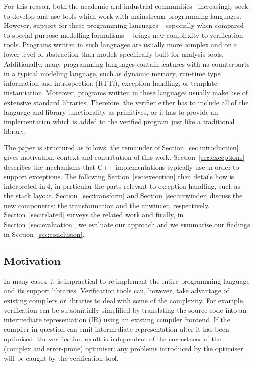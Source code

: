For this reason, both the academic and industrial
communities~\cite{beyer16:reliab.reprod} increasingly seek to develop
and use tools which work with mainstream programming languages. However,
support for these programming languages -- especially when compared to
special-purpose modelling formalisms -- brings new complexity to
verification tools. Programs written in such languages are usually more
complex and on a lower level of abstraction than models specifically
built for analysis tools. Additionally, many programming languages
contain features with no counterparts in a typical modeling language,
such as dynamic memory, run-time type information and introspection
(RTTI), exception handling, or template instantiation. Moreover,
programs written in these languages usually make use of extensive
standard libraries. Therefore, the verifier either has to include all of
the language and library functionality as primitives, or it has to
provide an implementation which is added to the verified program just
like a traditional library.

The paper is structured as follows: the remainder of
Section~\ref{sec:introduction} gives motivation, context and
contribution of this work. Section~\ref{sec:exceptions} describes the
mechanisms that C++ implementations typically use in order to support
exceptions. The following Section~\ref{sec:execution} then details how
\llvm{} is interpreted in \divine{} 4, in particular the parts relevant to
exception handling, such as the stack layout.
Section~\ref{sec:transform} and Section~\ref{sec:unwinder} discuss the
new components: the \llvm{} transformation and the unwinder, respectively.
Section~\ref{sec:related} surveys the related work and finally, in
Section~\ref{sec:evaluation}, we evaluate our approach and we summarise
our findings in Section~\ref{sec:conclusion}.

\subsection{Motivation}\label{sec:motivation}

In many cases, it is impractical to re-implement the entire programming
language and its support libraries. Verification tools can, however,
take advantage of existing compilers or libraries to deal with some of
the complexity. For example, verification can be substantially
simplified by translating the source code into an intermediate
representation (IR) using an existing compiler frontend. If the compiler
in question can emit intermediate representation after it has been
optimised, the verification result is independent of the correctness of
the (complex and error-prone) optimiser: any problems introduced by the
optimiser will be caught by the verification tool.

